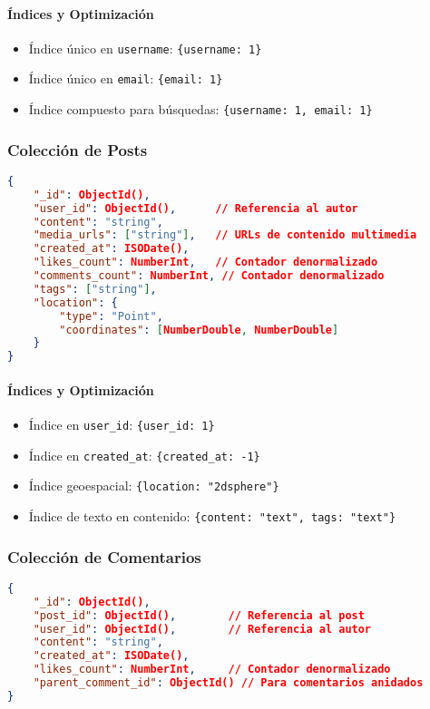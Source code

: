 \documentclass[12pt,letterpaper]{article}
\begin{document}
\paragraph{Índices y Optimización}
\begin{itemize}
    \item Índice único en \texttt{username}: \texttt{\{username: 1\}}
    \item Índice único en \texttt{email}: \texttt{\{email: 1\}}
    \item Índice compuesto para búsquedas: \texttt{\{username: 1, email: 1\}}
\end{itemize}

\subsubsection{Colección de Posts}
\begin{lstlisting}[language=json]
{
    "_id": ObjectId(),
    "user_id": ObjectId(),      // Referencia al autor
    "content": "string",
    "media_urls": ["string"],   // URLs de contenido multimedia
    "created_at": ISODate(),
    "likes_count": NumberInt,   // Contador denormalizado
    "comments_count": NumberInt, // Contador denormalizado
    "tags": ["string"],
    "location": {
        "type": "Point",
        "coordinates": [NumberDouble, NumberDouble]
    }
}
\end{lstlisting}

\paragraph{Índices y Optimización}
\begin{itemize}
    \item Índice en \texttt{user\_id}: \texttt{\{user\_id: 1\}}
    \item Índice en \texttt{created\_at}: \texttt{\{created\_at: -1\}}
    \item Índice geoespacial: \texttt{\{location: "2dsphere"\}}
    \item Índice de texto en contenido: \texttt{\{content: "text", tags: "text"\}}
\end{itemize}

\subsubsection{Colección de Comentarios}
\begin{lstlisting}[language=json]
{
    "_id": ObjectId(),
    "post_id": ObjectId(),        // Referencia al post
    "user_id": ObjectId(),        // Referencia al autor
    "content": "string",
    "created_at": ISODate(),
    "likes_count": NumberInt,     // Contador denormalizado
    "parent_comment_id": ObjectId() // Para comentarios anidados
}
\end{lstlisting}
\end{document}
